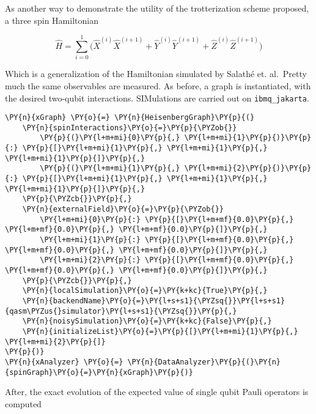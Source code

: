 As another way to demonstrate the utility of the trotterization scheme
proposed, a three spin Hamiltonian

\[
\hat{H} = \sum_{i=0}^{1} \bigg(\hat{X}^{(i)}\hat{X}^{(i+1)} + \hat{Y}^{(i)}\hat{Y}^{(i+1)} + \hat{Z}^{(i)}\hat{Z}^{(i+1)} \bigg)
\]

Which is a generalization of the Hamiltonian simulated by Salathé et.
al.~Pretty much the same observables are measured. As before, a graph is
instantiated, with the desired two-qubit interactions. SIMulations are
carried out on \texttt{ibmq\_jakarta}.

    \begin{tcolorbox}[breakable, size=fbox, boxrule=1pt, pad at break*=1mm,colback=cellbackground, colframe=cellborder]
\begin{Verbatim}[commandchars=\\\{\}]
\PY{n}{xGraph} \PY{o}{=} \PY{n}{HeisenbergGraph}\PY{p}{(}
    \PY{n}{spinInteractions}\PY{o}{=}\PY{p}{\PYZob{}}
        \PY{p}{(}\PY{l+m+mi}{0}\PY{p}{,} \PY{l+m+mi}{1}\PY{p}{)}\PY{p}{:} \PY{p}{[}\PY{l+m+mi}{1}\PY{p}{,} \PY{l+m+mi}{1}\PY{p}{,} \PY{l+m+mi}{1}\PY{p}{]}\PY{p}{,}
        \PY{p}{(}\PY{l+m+mi}{1}\PY{p}{,} \PY{l+m+mi}{2}\PY{p}{)}\PY{p}{:} \PY{p}{[}\PY{l+m+mi}{1}\PY{p}{,} \PY{l+m+mi}{1}\PY{p}{,} \PY{l+m+mi}{1}\PY{p}{]}\PY{p}{,}
    \PY{p}{\PYZcb{}}\PY{p}{,}
    \PY{n}{externalField}\PY{o}{=}\PY{p}{\PYZob{}}
        \PY{l+m+mi}{0}\PY{p}{:} \PY{p}{[}\PY{l+m+mf}{0.0}\PY{p}{,} \PY{l+m+mf}{0.0}\PY{p}{,} \PY{l+m+mf}{0.0}\PY{p}{]}\PY{p}{,}
        \PY{l+m+mi}{1}\PY{p}{:} \PY{p}{[}\PY{l+m+mf}{0.0}\PY{p}{,} \PY{l+m+mf}{0.0}\PY{p}{,} \PY{l+m+mf}{0.0}\PY{p}{]}\PY{p}{,}
        \PY{l+m+mi}{2}\PY{p}{:} \PY{p}{[}\PY{l+m+mf}{0.0}\PY{p}{,} \PY{l+m+mf}{0.0}\PY{p}{,} \PY{l+m+mf}{0.0}\PY{p}{]}\PY{p}{,}
    \PY{p}{\PYZcb{}}\PY{p}{,}
    \PY{n}{localSimulation}\PY{o}{=}\PY{k+kc}{True}\PY{p}{,}
    \PY{n}{backendName}\PY{o}{=}\PY{l+s+s1}{\PYZsq{}}\PY{l+s+s1}{qasm\PYZus{}simulator}\PY{l+s+s1}{\PYZsq{}}\PY{p}{,}
    \PY{n}{noisySimulation}\PY{o}{=}\PY{k+kc}{False}\PY{p}{,}
    \PY{n}{initializeList}\PY{o}{=}\PY{p}{[}\PY{l+m+mi}{1}\PY{p}{,} \PY{l+m+mi}{2}\PY{p}{]}
\PY{p}{)}
\PY{n}{xAnalyzer} \PY{o}{=} \PY{n}{DataAnalyzer}\PY{p}{(}\PY{n}{spinGraph}\PY{o}{=}\PY{n}{xGraph}\PY{p}{)}
\end{Verbatim}
\end{tcolorbox}

    After, the exact evolution of the expected value of single qubit Pauli
operators is computed

